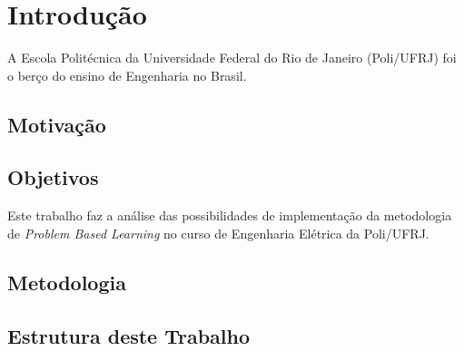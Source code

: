 \chapter{Introdução}

	A Escola Politécnica  da Universidade Federal do Rio de Janeiro  (Poli/UFRJ) foi o berço do ensino de Engenharia no Brasil. 

	\section{Motivação}
		
	\section{Objetivos}
	
		Este trabalho faz a análise das possibilidades de implementação da metodologia de \textit{Problem Based Learning} no curso de Engenharia Elétrica da Poli/UFRJ.
		
	\section{Metodologia}
		
	\section{Estrutura deste Trabalho}